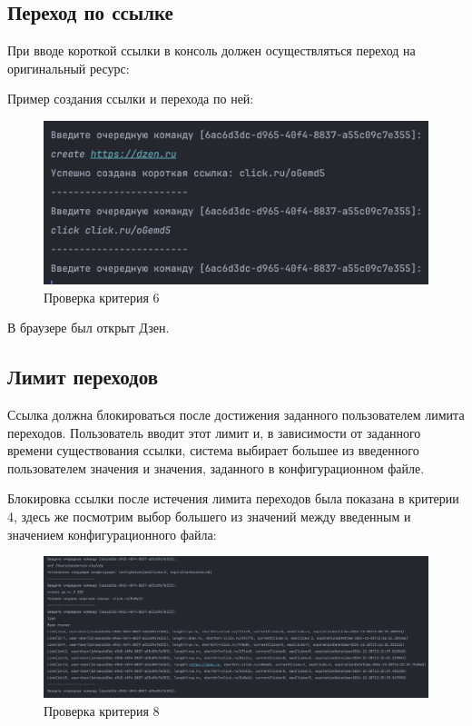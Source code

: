\documentclass[a4paper, 14pt]{article}
\begin{document}
\subsection{Переход по ссылке}

При вводе короткой ссылки в консоль должен осуществляться переход на оригинальный ресурс:

Пример создания ссылки и перехода по ней:

\begin{figure}[H]
	\centering
	\includegraphics[width=17cm]{resources/10.png}
	\caption{Проверка критерия 6}
\end{figure}

В браузере был открыт Дзен.

\subsection{Лимит переходов}

Ссылка должна блокироваться после достижения заданного пользователем лимита переходов. Пользователь вводит этот лимит и, в зависимости от заданного времени существования ссылки, система выбирает большее из введенного пользователем значения и значения, заданного в конфигурационном файле.

Блокировка ссылки после истечения лимита переходов была показана в критерии 4, здесь же посмотрим выбор большего из значений между введенным и значением конфигурационного файла:

\begin{figure}[H]
	\centering
	\includegraphics[width=17cm]{resources/11.png}
	\caption{Проверка критерия 8}
\end{figure}
\end{document}
